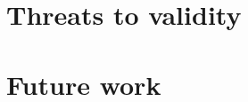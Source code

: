 \section{Threats to validity}
\begin{comment}
* Is the Ohloh database a representation of the world of OSS projects?
* Is LOC as the sum of source lines of code, comments, and blank lines valid?
* The use of LOC as a measure of project evolution. Does it represent
activity/growth/whatever to say something about the project's status?
* A selection criterion for the projects was a continuous series of subsequent
monthly facts. Maybe the full series of evolution data of a project is needed in
order to find objective signs or to be able to compare different projects.
* Is 250 projects enough to detect patterns and generalise to the world of OSS
projects?
* Is monthly aggregated data fine-grained enough?

\end{comment}

\section{Future work}

\begin{comment}
- Analyse results
- Conclude and interpret results
- Answer hypotheses and research questions
- Threats to validity
- Discussion
- Future work
 
This chapter contains the analysis and interpretation of the results. The
research questions are answered as best as possible given the results that were
obtained. The analysis also discussed parts of the questions that were left
unanswered.

An important topic is the validity of the results.
What methods of validation were used?
Could the results be generalized to other cases?
What threats to validity can be identified?

There is room here to discuss the results of related scientific literature here
as well.
How do the results obtained here relate to other work, and what consequences are
there?
Did your approach work better or worse?
Did you learn anything new compared to the already existing body of knowledge?
Finally, what could you say in hindsight on the research approach by followed?
What could have done better?
What lessons have been learned?
What could other researchers use from your experience?

A separate section should be devoted to ‘future work,’ i.e., possible extension
points of your work that you have identified. Other researchers (or yourself)
could use those as a starting point.

Refer to Chapters 3.7 and 4 in this example thesis at Paul’s
homepage\footnote{http://homepages.cwi.nl/~paulk/thesesMasterSoftwareEngineering/2006/ReneWiegers.pdf}.
\end{comment}
